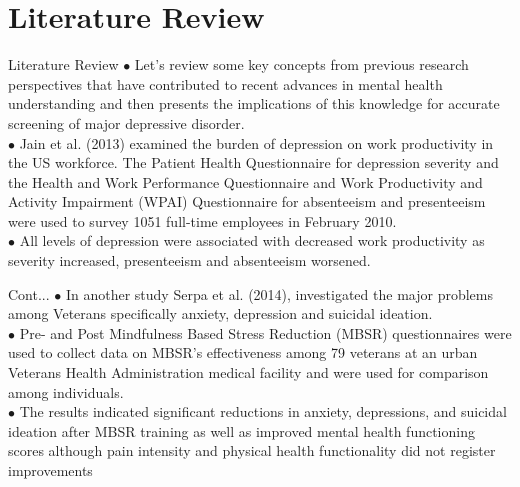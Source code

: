 \documentclass{beamer}
\begin{document}
\section{Literature Review}
\begin{frame}{Literature Review}
$\bullet$ Let's review some key concepts from previous research perspectives that have
contributed to recent advances in mental health understanding and then presents the implications of this knowledge for accurate screening of major depressive disorder.\\
\vspace{3mm}
$\bullet$ Jain et al. (2013) examined the burden of depression on work productivity in the US workforce. The Patient Health Questionnaire for depression severity and the Health and Work Performance Questionnaire and Work Productivity and Activity Impairment (WPAI) Questionnaire for absenteeism and presenteeism were used to survey 1051 full-time employees in February 2010.\\
\vspace{3mm}
$\bullet$ All levels of depression were associated with decreased work productivity as severity increased, presenteeism and absenteeism worsened.
\end{frame}


\begin{frame}{Cont...}
$\bullet$ In another study Serpa et al. (2014), investigated the major problems among Veterans
specifically anxiety, depression and suicidal ideation. \\
\vspace{3mm}
$\bullet$ Pre- and Post Mindfulness Based Stress Reduction (MBSR) questionnaires were used to collect data on MBSR’s effectiveness among 79 veterans at an urban Veterans Health Administration medical facility and were used for comparison among individuals. \\
\vspace{3mm}
$\bullet$ The results indicated significant reductions in anxiety, depressions, and  suicidal ideation after MBSR training as well as improved mental health functioning scores although pain intensity and physical health functionality did not register improvements
\end{frame}
\end{document}
